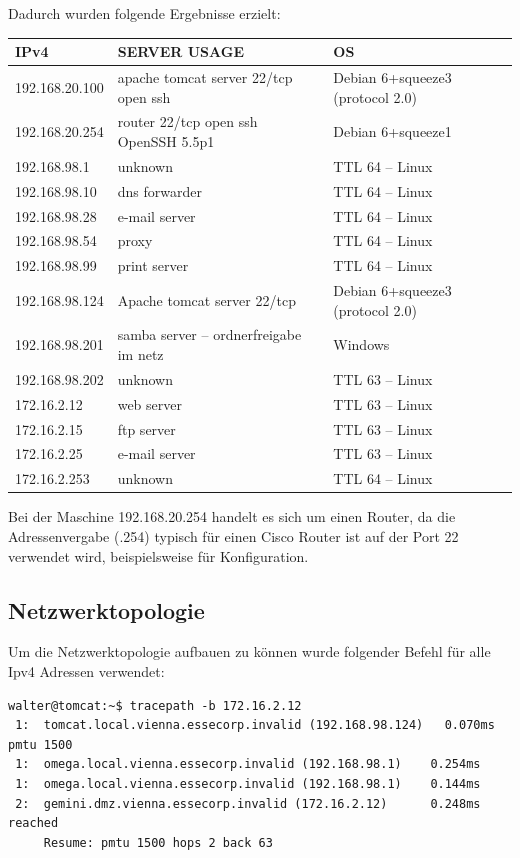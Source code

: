 \documentclass[12pt,a4paper,titlepage,oneside]{scrartcl}
\begin{document}
\newpage
\noindent
Dadurch wurden folgende Ergebnisse erzielt:

\begin{tabular}{l|l|l}
\hline
IPv4 & 	SERVER USAGE	 & OS\\ \hline
192.168.20.100	 & apache tomcat server	22/tcp open ssh  & Debian 6+squeeze3 (protocol 2.0)\\ \hline
192.168.20.254	 & router	22/tcp open ssh OpenSSH 5.5p1  & Debian 6+squeeze1\\ \hline
192.168.98.1	 & unknown	 & TTL 64 – Linux\\ \hline
192.168.98.10	 & dns forwarder	 & TTL 64 – Linux\\ \hline
192.168.98.28	 & e-mail server	 & TTL 64 – Linux\\ \hline
192.168.98.54	 & proxy	 & TTL 64 – Linux\\ \hline
192.168.98.99	 & print server	 & TTL 64 – Linux\\ \hline
192.168.98.124	 & Apache tomcat server	22/tcp & Debian 6+squeeze3 (protocol 2.0)\\ \hline
192.168.98.201	 & samba server – ordnerfreigabe im netz	 & Windows \\ \hline
192.168.98.202	 & unknown	 & TTL 63 – Linux\\ \hline
172.16.2.12	 & web server	 & TTL 63 – Linux\\ \hline
172.16.2.15	 & ftp server	 & TTL 63 – Linux\\ \hline
172.16.2.25	 & e-mail server	 & TTL 63 – Linux\\ \hline
172.16.2.253	 & unknown	 & TTL 64 – Linux\\ \hline
\end{tabular}

\noindent
Bei der Maschine 192.168.20.254 handelt es sich um einen Router, da die Adressenvergabe (.254) typisch für einen Cisco Router ist auf der Port 22 verwendet wird, beispielsweise für Konfiguration.

\newpage
\subsection{Netzwerktopologie}
Um die Netzwerktopologie aufbauen zu können wurde folgender Befehl für alle Ipv4 Adressen verwendet:

\begin{lstlisting}[caption=nmap OS Connections,style=simple]
walter@tomcat:~$ tracepath -b 172.16.2.12
 1:  tomcat.local.vienna.essecorp.invalid (192.168.98.124)   0.070ms pmtu 1500
 1:  omega.local.vienna.essecorp.invalid (192.168.98.1)    0.254ms 
 1:  omega.local.vienna.essecorp.invalid (192.168.98.1)    0.144ms 
 2:  gemini.dmz.vienna.essecorp.invalid (172.16.2.12)      0.248ms reached
     Resume: pmtu 1500 hops 2 back 63 
\end{lstlisting}
\end{document}
